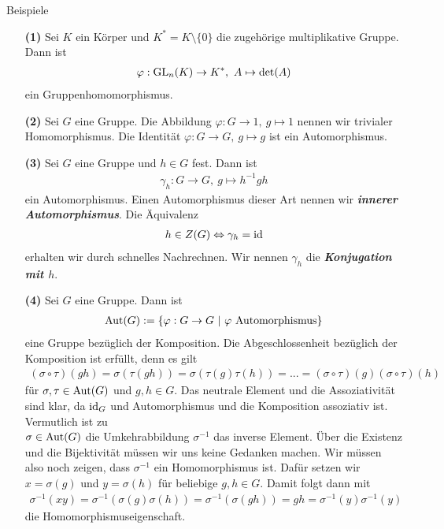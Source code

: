 \begin{genericdf}{Beispiele} \
\begin{enumerate}
\item[\textbf{(1)}]
Sei $K$ ein Körper und $K^\ast = K \setminus \lbrace 0 \rbrace$ die zugehörige multiplikative Gruppe.
Dann ist 
\begin{align*}
\varphi: \operatorname{GL}_n(K) \to K^\ast,\ A \mapsto \det(A)
\end{align*}
ein Gruppenhomomorphismus.
\item[\textbf{(2)}]Sei $G$ eine Gruppe.
Die Abbildung $\varphi : G \to 1,\ g \mapsto 1$ nennen wir trivialer Homomorphismus.
Die Identität $\varphi : G \to G,\ g \mapsto g$ ist ein Automorphismus.
\item[\textbf{(3)}]
Sei $G$ eine Gruppe und $h \in G$ fest.
Dann ist 
\begin{align*}
\gamma_h : G \to G, \ g \mapsto h^{-1}gh
\end{align*}
ein Automorphismus. Einen Automorphismus dieser Art nennen wir
\textbf{\textit{innerer Automorphismus}}. 
Die Äquivalenz
\begin{align*}
h \in Z(G) \Leftrightarrow \gamma_h = \operatorname{id}
\end{align*}
erhalten wir durch schnelles Nachrechnen.
Wir nennen $\gamma_h$ die \textbf{\textit{Konjugation mit $h$}}. 
\item[\textbf{(4)}]
Sei $G$ eine Gruppe. Dann ist 
\begin{align*}
\Aut(G)  := \lbrace \varphi : G \to G \ | \ \varphi \ \text{Automorphismus} \rbrace
\end{align*}
eine Gruppe bezüglich der Komposition.
Die Abgeschlossenheit bezüglich der Komposition ist erfüllt, denn es gilt 
\begin{align*}
(\sigma \circ \tau)(gh) 
= \sigma(\tau(gh)) = \sigma(\tau(g)\tau(h)) = ... = (\sigma \circ \tau)(g) (\sigma \circ \tau)(h)
\end{align*}
für $\sigma, \tau \in \operatorname{Aut}(G)$ und $g,h \in G$.
Das neutrale Element und die Assoziativität sind klar, da $\operatorname{id}_G$ und Automorphismus und die Komposition assoziativ ist.
Vermutlich ist zu \\
$\sigma \in \operatorname{Aut}(G)$ die Umkehrabbildung $\sigma^{-1}$ das inverse Element.
Über die Existenz und die Bijektivität müssen wir uns keine Gedanken machen.
Wir müssen also noch zeigen, dass $\sigma^{-1}$ ein Homomorphismus ist.
Dafür setzen wir $x =\sigma(g)$ und $y= \sigma(h)$ für beliebige $g,h \in G$.
Damit folgt dann mit
\begin{align*}
\sigma^{-1}(xy)= \sigma^{-1}(\sigma(g)\sigma(h)) = \sigma^{-1}(\sigma(gh)) = gh = \sigma^{-1}(y) \sigma^{-1}(y)
\end{align*}
die Homomorphismuseigenschaft.
\end{enumerate}

\end{genericdf}

